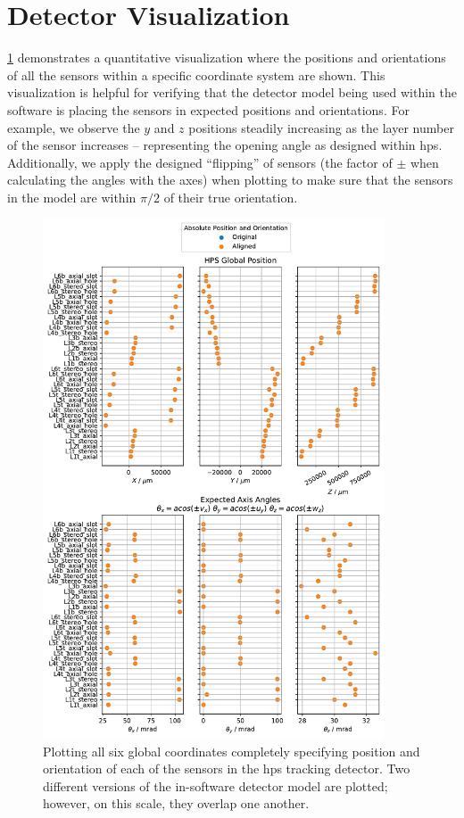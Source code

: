 \section{Detector Visualization}

\cref{fig:example-det-vis-abs} demonstrates a quantitative visualization where
the positions and orientations of all the sensors within a specific coordinate system are shown.
This visualization is helpful for verifying that the detector model being used within the software
is placing the sensors in expected positions and orientations. For example, we observe the $y$ and
$z$ positions steadily increasing as the layer number of the sensor increases -- representing the
opening angle as designed within \ac{hps}. Additionally, we apply the designed ``flipping'' of
sensors (the factor of $\pm$ when calculating the angles with the axes)
when plotting to make sure that the sensors in the model are within $\pi/2$ of their true orientation.

\begin{figure}
  \centering
  \includegraphics[width=0.9\textwidth]{figures/hps/alignment/example-det-vis-abs.pdf}
  \caption{Plotting all six global coordinates completely specifying position and orientation
    of each of the sensors in the \ac{hps} tracking detector. Two different versions of the
    in-software detector model are plotted; however, on this scale, they overlap one another.}
  \label{fig:example-det-vis-abs}
\end{figure}

